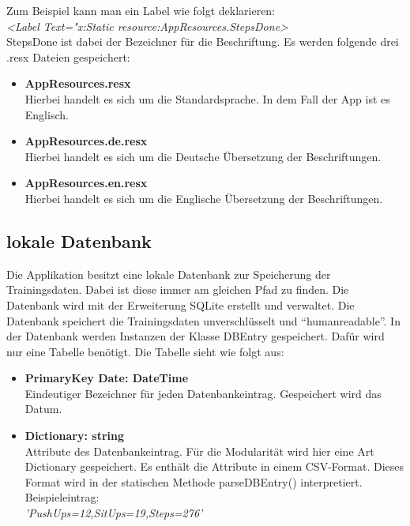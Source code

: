 \documentclass[a4paper,12pt]{article}
\begin{document}
Zum Beispiel kann man ein Label wie folgt deklarieren:\\\textit{<Label Text="{x:Static resource:AppResources.StepsDone}>}\\ StepsDone ist dabei der Bezeichner für die Beschriftung.
Es werden folgende drei .resx Dateien gespeichert: 
\begin{itemize}
	\item \textbf{AppResources.resx}\\Hierbei handelt es sich um die Standardsprache. In dem Fall der App ist es Englisch.
	\item \textbf{AppResources.de.resx}\\Hierbei handelt es sich um die Deutsche Übersetzung der Beschriftungen.
	\item \textbf{AppResources.en.resx}\\Hierbei handelt es sich um die Englische Übersetzung der Beschriftungen.
\end{itemize}

\subsection{lokale Datenbank}

Die Applikation besitzt eine lokale \gls{Datenbank} zur Speicherung der Trainingsdaten. Dabei ist diese immer am gleichen Pfad zu finden. Die Datenbank wird mit der Erweiterung \gls{SQLite} erstellt und verwaltet. Die Datenbank speichert die Trainingsdaten unverschlüsselt und ``humanreadable''. In der Datenbank werden Instanzen der Klasse DBEntry gespeichert. Dafür wird nur eine Tabelle benötigt. Die Tabelle sieht wie folgt aus:


\begin{itemize}
	\item \textbf{PrimaryKey Date: DateTime}\\Eindeutiger Bezeichner für jeden Datenbankeintrag. Gespeichert wird das Datum.
	\item \textbf{Dictionary: string}\\Attribute des Datenbankeintrag. Für die Modularität wird hier eine Art Dictionary gespeichert. Es enthält die Attribute in einem \gls{CSV}-Format. Dieses Format wird in der statischen Methode parseDBEntry() interpretiert. Beispieleintrag:\\ \textit{'PushUps=12,SitUps=19,Steps=276'}
\end{itemize}
 
\end{document}
